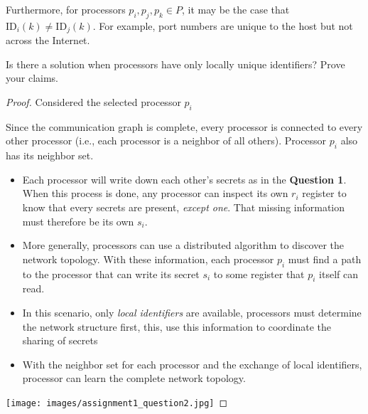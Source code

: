 \documentclass[12pt]{article}
\begin{document}
Furthermore, for processors $p_i, p_j, p_k \in P$, 
it may be the case that $\mathrm{ID}_i(k) \neq \mathrm{ID}_j(k)$. 
For example, port numbers are unique to the host but not across the Internet. 

Is there a solution when processors have only locally unique identifiers? 
Prove your claims.

\bigskip

\begin{proof}

Considered the selected processor \(p_i\)

Since the communication graph is complete, every processor is connected to every 
other processor (i.e., each processor is a neighbor of all others). Processor \(p_i\) 
also has its neighbor set.

\begin{itemize}
    \item Each processor will write down each other's secrets as in the \textbf{Question 1}. When 
    this process is done, any processor can inspect its own \(r_i\) register to know that every 
    secrets are present, \emph{except one}. That missing information must therefore be its own
    \(s_i\).
    \item More generally, processors can use a distributed algorithm to discover the network topology. 
    With these information, each processor \(p_i\) must find a path to the processor that can write its
    secret \(s_i\) to some register that \(p_i\) itself can read.
    \item In this scenario, only \emph{local identifiers} are available, processors must determine the network
    structure first, this, use this information to coordinate the sharing of secrets
    \item With the neighbor set for each processor and the exchange of local identifiers, processor can learn the complete
    network topology.
\end{itemize}

\texttt{[image: images/assignment1\_question2.jpg]}


\end{proof}


\vspace{2in} %

\vspace{3in}
\end{document}
